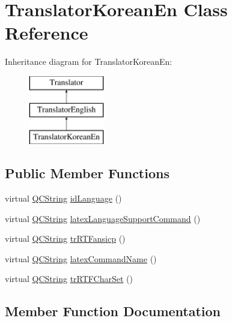 \hypertarget{class_translator_korean_en}{}\section{Translator\+Korean\+En Class Reference}
\label{class_translator_korean_en}
Inheritance diagram for Translator\+Korean\+En\+:\begin{figure}[H]
\begin{center}
\leavevmode
\includegraphics[height=3.000000cm]{class_translator_korean_en}
\end{center}
\end{figure}
\subsection*{Public Member Functions}
\begin{DoxyCompactItemize}
\item 
virtual \mbox{\hyperlink{class_q_c_string}{Q\+C\+String}} \mbox{\hyperlink{class_translator_korean_en_a255647e0edbc0550871133c143cc08a7}{id\+Language}} ()
\item 
virtual \mbox{\hyperlink{class_q_c_string}{Q\+C\+String}} \mbox{\hyperlink{class_translator_korean_en_a0db5fe9ae0843e3f89b0b9770ba32d32}{latex\+Language\+Support\+Command}} ()
\item 
virtual \mbox{\hyperlink{class_q_c_string}{Q\+C\+String}} \mbox{\hyperlink{class_translator_korean_en_ac60d57743cc1cd0a7b6bc6c57a445b7e}{tr\+R\+T\+Fansicp}} ()
\item 
virtual \mbox{\hyperlink{class_q_c_string}{Q\+C\+String}} \mbox{\hyperlink{class_translator_korean_en_a3b71d2ee009c7e529e60cb43898bcce7}{latex\+Command\+Name}} ()
\item 
virtual \mbox{\hyperlink{class_q_c_string}{Q\+C\+String}} \mbox{\hyperlink{class_translator_korean_en_ad0ac561385e4e2583eb5f3aaf5303f4d}{tr\+R\+T\+F\+Char\+Set}} ()
\end{DoxyCompactItemize}


\subsection{Member Function Documentation}
\mbox{\label{class_translator_korean_en_a255647e0edbc0550871133c143cc08a7}} 
